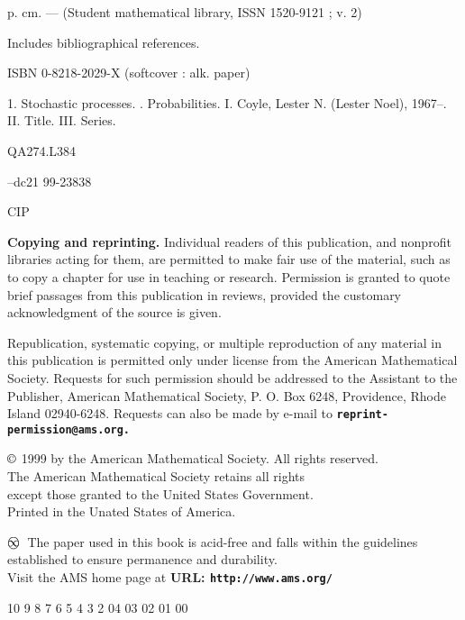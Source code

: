 \documentclass{stml-l}
\newcommand\circledinfty{\ooalign{$\bigcirc$\cr$\infty$\cr}\space}
\newenvironment{copyrightpage}{\clearpage\null\thispagestyle{empty}}{\thispagestyle{empty}\clearpage}
\theoremstyle{definition}
\numberwithin{equation}{chapter}
\numberwithin{figure}{chapter}
\numberwithin{figure}{section}
\begin{document}
\begin{copyrightpage}
\quad p. cm. --- (Student mathematical library, ISSN 1520-9121 ; v. 2)

Includes bibliographical references.

ISBN 0-8218-2029-X (softcover : alk. paper)

1. Stochastic processes. . Probabilities. \quad I. Coyle, Lester N. (Lester Noel), 1967--. \quad II. Title. \quad III. Series.

\noindent QA274.L384 

--dc21 \hfill 99-23838

\hfill CIP

\hrulefill

\textbf{Copying and reprinting.} Individual readers of this publication, and nonprofit libraries acting for them, are permitted to make fair use of the material, such as to copy a chapter for use in teaching or research. Permission is granted to quote brief passages from this publication in reviews, provided the customary acknowledgment of the source is given.

Republication, systematic copying, or multiple reproduction of any material in this publication is permitted only under license from the American Mathematical Society. Requests for such permission should be addressed to the Assistant to the Publisher, American Mathematical Society, P. O. Box 6248, Providence, Rhode Island 02940-6248. Requests can also be made by e-mail to \textbf{\texttt{reprint-permission@ams.org.}}

\begin{center}
$\copyright$ 1999 by the American Mathematical Society. All rights reserved.\\
The American Mathematical Society retains all rights\\
except those granted to the United States Government.\\
Printed in the Unated States of America.
\end{center}

\begin{center}
$\circledinfty$\ The paper used in this book is acid-free and falls within the guidelines\\
established to ensure permanence and durability.\\
Visit the AMS home page at \textbf{URL: \texttt{http://www.ams.org/}}
\end{center}

\begin{center}
10 9 8 7 6 5 4 3 2  04 03 02 01 00
\end{center}
\end{copyrightpage}
\end{document}
